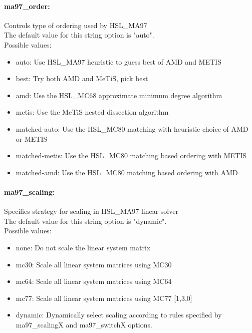 \paragraph{ma97\_order:}\label{opt:ma97_order} Controls type of ordering used by HSL\_MA97 \\
 The default value for this string option is "auto".
\\ 
Possible values:
\begin{itemize}
   \item auto: Use HSL\_MA97 heuristic to guess best of AMD and METIS
   \item best: Try both AMD and MeTiS, pick best
   \item amd: Use the HSL\_MC68 approximate minimum degree algorithm
   \item metis: Use the MeTiS nested dissection algorithm
   \item matched-auto: Use the HSL\_MC80 matching with heuristic choice of AMD or METIS
   \item matched-metis: Use the HSL\_MC80 matching based ordering with METIS
   \item matched-amd: Use the HSL\_MC80 matching based ordering with AMD
\end{itemize}

\paragraph{ma97\_scaling:}\label{opt:ma97_scaling} Specifies strategy for scaling in HSL\_MA97 linear solver \\
 The default value for this string option is "dynamic".
\\ 
Possible values:
\begin{itemize}
   \item none: Do not scale the linear system matrix
   \item mc30: Scale all linear system matrices using MC30
   \item mc64: Scale all linear system matrices using MC64
   \item mc77: Scale all linear system matrices using MC77 [1,3,0]
   \item dynamic: Dynamically select scaling according to rules specified by ma97\_scalingX and ma97\_switchX options.
\end{itemize}

